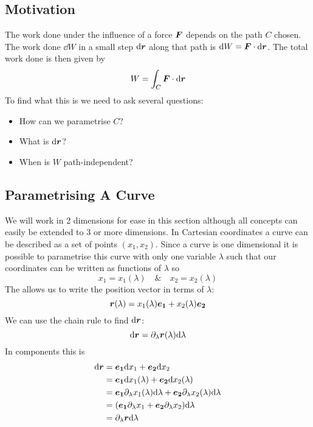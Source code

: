 \documentclass{article}
\begin{document}
    \subsection{Motivation}
    The work done under the influence of a force \(\bm{F}\) depends on the path \(C\) chosen.
    The work done \(\dd W\) in a small step \(\dd \bm{r}\) along that path is \(\dd W = \bm{F}\cdot\dd\bm{r}\).
    The total work done is then given by
    \[W = \int_C\bm{F}\cdot\dd\bm{r}\]
    To find what this is we need to ask several questions:
    \begin{itemize}
        \item How can we parametrise \(C\)?
        \item What is \(\dd\bm{r}\)?
        \item When is \(W\) path-independent?
    \end{itemize}
    
    \subsection{Parametrising A Curve}
    We will work in 2 dimensions for ease in this section although all concepts can easily be extended to 3 or more dimensions.
    In Cartesian coordinates a curve can be described as a set of points \((x_1, x_2)\).
    Since a curve is one dimensional it is possible to parametrise this curve with only one variable \(\lambda\) such that our coordinates can be written as functions of \(\lambda\) so
    \[x_1 = x_1(\lambda)\quad \&\quad x_2 = x_2(\lambda)\]
    The allows us to write the position vector in terms of \(\lambda\):
    \[\bm{r}(\lambda) = x_1(\lambda)\bm{e_{1}} + x_2(\lambda)\bm{e_{2}}\]
    We can use the chain rule to find \(\dd\bm{r}\):
    \[\dd\bm{r} = \partial_\lambda\bm{r}(\lambda)\dd\lambda\]
    In components this is
    \begin{align*}
        \dd\bm{r} &= \bm{e_{1}}\dd x_1 + \bm{e_{2}}\dd x_2\\
        &= \bm{e_{1}}\dd x_1(\lambda) + \bm{e_{2}}\dd x_2(\lambda)\\
        &= \bm{e_{1}}\partial_\lambda x_1(\lambda)\dd\lambda + \bm{e_{2}}\partial_\lambda x_2(\lambda)\dd\lambda\\
        &= (\bm{e_{1}}\partial_\lambda x_1 + \bm{e_{2}}\partial_\lambda x_2)\dd\lambda\\
        &= \partial_\lambda\bm{r}\dd\lambda
    \end{align*}
    
\end{document}
